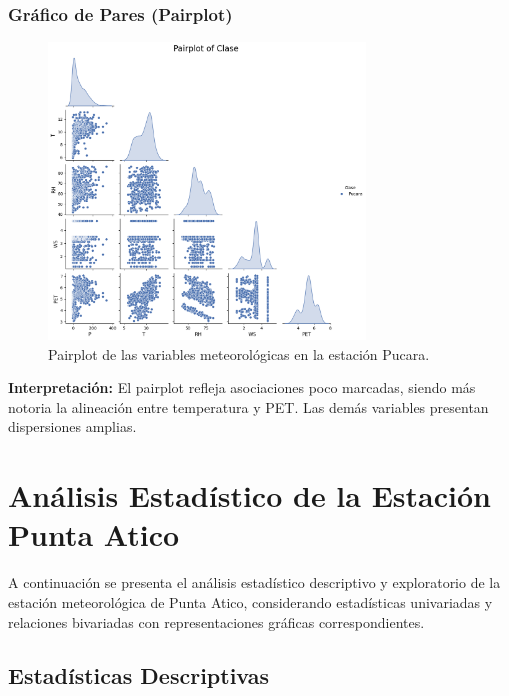 \subsubsection*{Gráfico de Pares (Pairplot)}
\begin{figure}[htbp]
\centering
\includegraphics[width=0.75\textwidth]{resultados/por_estacion_meteorologica/Pucara/pairplot.png}
\caption{Pairplot de las variables meteorológicas en la estación Pucara.}
\label{fig:pucara_pairplot}
\end{figure}
\textbf{Interpretación:} El pairplot refleja asociaciones poco marcadas, siendo más notoria la alineación entre temperatura y PET. Las demás variables presentan dispersiones amplias.


\section{Análisis Estadístico de la Estación Punta Atico}

A continuación se presenta el análisis estadístico descriptivo y exploratorio de la estación meteorológica de Punta Atico, considerando estadísticas univariadas y relaciones bivariadas con representaciones gráficas correspondientes.

\subsection{Estadísticas Descriptivas}

